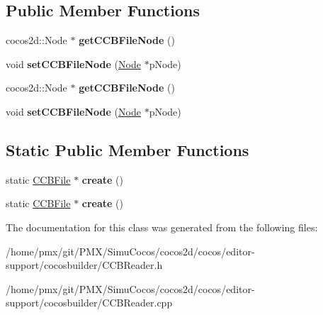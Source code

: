 \subsection*{Public Member Functions}
\begin{DoxyCompactItemize}
\item 
\mbox{\label{classcocosbuilder_1_1CCBFile_ab7b9836e0f5bf365ce1d146b1b7acfc5}} 
cocos2d\+::\+Node $\ast$ {\bfseries get\+C\+C\+B\+File\+Node} ()
\item 
\mbox{\label{classcocosbuilder_1_1CCBFile_a7bb41d15d2d0748ce6ab7b1133e469f3}} 
void {\bfseries set\+C\+C\+B\+File\+Node} (\hyperlink{classNode}{Node} $\ast$p\+Node)
\item 
\mbox{\label{classcocosbuilder_1_1CCBFile_a98b6b30a983b068f3c2ab711e5d8ef6c}} 
cocos2d\+::\+Node $\ast$ {\bfseries get\+C\+C\+B\+File\+Node} ()
\item 
\mbox{\label{classcocosbuilder_1_1CCBFile_a7bb41d15d2d0748ce6ab7b1133e469f3}} 
void {\bfseries set\+C\+C\+B\+File\+Node} (\hyperlink{classNode}{Node} $\ast$p\+Node)
\end{DoxyCompactItemize}
\subsection*{Static Public Member Functions}
\begin{DoxyCompactItemize}
\item 
\mbox{\label{classcocosbuilder_1_1CCBFile_a5bde41559b33ca46daada837a45c4439}} 
static \hyperlink{classcocosbuilder_1_1CCBFile}{C\+C\+B\+File} $\ast$ {\bfseries create} ()
\item 
\mbox{\label{classcocosbuilder_1_1CCBFile_a41a425b4cdedacbac7636cfa56f68dfc}} 
static \hyperlink{classcocosbuilder_1_1CCBFile}{C\+C\+B\+File} $\ast$ {\bfseries create} ()
\end{DoxyCompactItemize}


The documentation for this class was generated from the following files\+:\begin{DoxyCompactItemize}
\item 
/home/pmx/git/\+P\+M\+X/\+Simu\+Cocos/cocos2d/cocos/editor-\/support/cocosbuilder/C\+C\+B\+Reader.\+h\item 
/home/pmx/git/\+P\+M\+X/\+Simu\+Cocos/cocos2d/cocos/editor-\/support/cocosbuilder/C\+C\+B\+Reader.\+cpp\end{DoxyCompactItemize}
